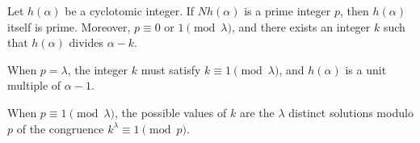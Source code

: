 Let $h(\alpha)$ be a cyclotomic integer. If $Nh(\alpha)$ is a prime integer $p$, then $h(\alpha)$ itself is prime. Moreover, $p \equiv 0$ or $1 \pmod{\lambda}$, and there exists an integer $k$ such that $h(\alpha)$ divides $\alpha - k$.

When $p = \lambda$, the integer $k$ must satisfy $k \equiv 1 \pmod{\lambda}$, and $h(\alpha)$ is a unit multiple of $\alpha - 1$.

When $p \equiv 1 \pmod{\lambda}$, the possible values of $k$ are the $\lambda$ distinct solutions modulo $p$ of the congruence $k^{\lambda} \equiv 1 \pmod{p}$.
